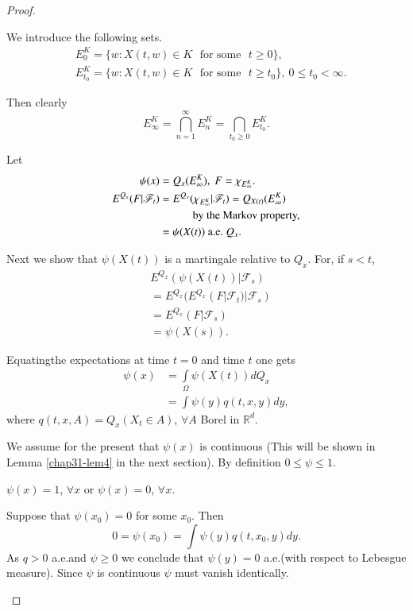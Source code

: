 \begin{proof}
\setcounter{step}{0}
\begin{step}%
We introduce the following sets.
\begin{align*}
& E^{K}_{0} =\{w:X(t,w)\in K\text{~ for some~ } t\geq 0\},\\
& E^{K}_{t_{0}}=\{w:X(t,w)\in K\text{~ for some~ }t\geq
  t_{0}\},\ 0\leq t_{0}<\infty.
\end{align*}

Then clearly
$$
E^{K}_{\infty}=\bigcap\limits^{\infty}_{n=1}E^{K}_{n}=\bigcap\limits_{t_{0}\geq 0}E^{K}_{t_{0}}.
$$

Let
\begin{align*}
\psi(x) &= Q_{x}(E^{K}_{\infty}),\ F=\chi_{E^{K}_{\infty}}.\\
E^{Q_{x}}(F|\mathscr{F}_{t}) &=
E^{Q_{x}}(\chi_{E^{K}_{\infty}}|\mathscr{F}_{t}) =Q_{X(t)}(E^{K}_{\infty})\\
&\qquad\quad \text{by the Markov property,}\\
&=\psi(X(t))\text{~ a.e.~ } Q_{x}.
\end{align*}
\end{step}

Next we show that $\psi(X(t))$ is a martingale relative to
$Q_{x}$. For, if $s<t$,
\begin{align*}
& E^{Q_{x}}(\psi(X(t))|\mathscr{F}_{s})\\
& =E^{Q_{x}}(E^{Q_{x}}(F|\mathscr{F}_{t})|\mathscr{F}_{s})\\
& =E^{Q_{x}}(F|\mathscr{F}_{s})\\
& =\psi(X(s)).
\end{align*}

Equating\pageoriginale the expectations at time $t=0$ and time $t$ one
gets 
\begin{align*}
\psi(x) &= \int\limits_{\Omega}\psi(X(t))dQ_{x}\\
&= \int \psi(y)q(t,x,y)dy,
\end{align*}
where $q(t,x,A)=Q_{x}(X_{t}\in A)$, $\forall A$ Borel in
$\mathbb{R}^{d}$. 

We assume for the present that $\psi(x)$ is continuous (This will be
shown in Lemma \ref{chap31-lem4} in the next section). By definition
$0\leq \psi\leq 1$.

\begin{step}%
$\psi(x)=1$, $\forall x$ or $\psi(x)=0$, $\forall x$.

Suppose that $\psi(x_{0})=0$ for some $x_{0}$. Then
$$
0=\psi(x_{0})=\int \psi(y)q(t,x_{0},y)dy.
$$ 
As $q>0$ a.e.\@ and
$\psi\geq 0$ we conclude that $\psi(y)=0$ a.e.\@ (with respect to
Lebesgue measure). Since $\psi$ is continuous $\psi$ must vanish
identically.
\end{step}


\end{proof}
